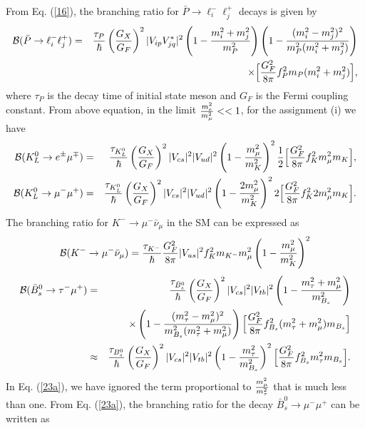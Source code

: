 \documentclass{ws-ijmpa}
\begin{document}
From Eq. (\ref{16}), the branching ratio for $\bar{P}\to \ell^{-}_i\ell^{+}_j$ decays is given by 
\begin{eqnarray}
\mathcal{B}(\bar{P}\to \ell^{-}_i\ell^{+}_j)&=&
\frac{\tau_{P}}{\hbar}\left({G_X\over G_F}\right)^2 |V_{ip}V^{*}_{jq}|^2\left(1-{m^2
_{i}+m^2
_{j}\over m^2_P}\right)\left(1-{(m^2
_{i}-m^2
_{j})^2\over {m^2_P(m^2
_{i}+m^2
_{j})}}\right)\notag\\
&&\times \Big[{G^2_F\over 8\pi}f^2_P
m_P(m^2
_{i}+m^2
_{j})\Big]\label{21},
\end{eqnarray}
where $\tau_{P}$ is the decay time of initial state meson and $G_{F}$ is the Fermi coupling constant. From above equation, in the limit ${m^{2}_{e}\over m^{2}_{\mu}} << 1$, for the assignment (i) we have 
\begin{eqnarray}
\mathcal{B}(K^{0}_{L}\rightarrow e^{\pm}\mu^{\mp}) &=& 
\frac{\tau_{K^0_L}}{\hbar}\left({G_X\over G_F}\right)^2 |V_{cs}|^2|V_{ud}|^2\left(1-{m^2
_{\mu}\over m^2_K}\right)^2{1\over 2}\Big[{G^2_F\over 8\pi}f^2_K
m^2_{\mu}m_K\Big]\label{22},\\
\mathcal{B}(K^{0}_{L}\rightarrow \mu^{-}\mu^{+}) &=& 
\frac{\tau_{K^0_L}}{\hbar}\left({G_X\over G_F}\right)^2 |V_{cs}|^2|V_{ud}|^2\left(1-{2m^2
_{\mu}\over m^2_K}\right)^2 2 \Big[{G^2_F\over 8\pi}f^2_K
2 m^2_{\mu}m_K\Big]\label{23}.
\end{eqnarray}
The branching ratio for $K^{-} \to \mu^{-}\bar{\nu}_{\mu}$ in the SM can be expressed as
\begin{equation}
\mathcal{B}(K^{-} \to \mu^{-}\bar{\nu}_{\mu}) = \frac{\tau_{K^{-}}}{\hbar}\frac{G^{2}_{F}}{8\pi}|V_{us}|^2f^{2}_{K}m_{K^{-}}m^{2}_{\mu}\left(1-{m^2
_{\mu}\over m^2_K}\right)^2\label{KSM}
\end{equation}
\begin{eqnarray}
\mathcal{B}(\bar{B}^{0}_{s}\rightarrow \tau^{-}\mu^{+}) &=& 
\frac{\tau_{\bar{B}^{0}_{s}}}{\hbar}\left({G_X\over G_F}\right)^2 |V_{cs}|^2|V_{tb}|^2\left(1-{m^2
_{\tau}+m^2
_{\mu}\over m^2_{B_s}}\right)\notag\\
&&\times \left(1-{(m^2
_{\tau}-m^2
_{\mu})^2\over {m^2_{B_s}}(m^2
_{\tau}+m^2
_{\mu})}\right) \Big[{G^2_F\over 8\pi}f^2_{B_s}
 (m^2_{\tau}+m^2_{\mu})m_{B_s}\Big]\notag \\
 &\approx & \frac{\tau_{B^0_s}}{\hbar}\left({G_X\over G_F}\right)^2 |V_{cs}|^2|V_{tb}|^2\left(1-{m^2
_{\tau}\over m^2_{B_s}}\right)^2 \Big[{G^2_F\over 8\pi}f^2_{B_s}
 m^2_{\tau}m_{B_s}\Big] \label{23a}.
\end{eqnarray}
In Eq. (\ref{23a}), we have ignored the term proportional to ${m^{2}_{\mu}\over m^{2}_{\tau}}$ that is much less than one. From Eq. (\ref{23a}), the branching ratio for the decay $\bar{B}^{0}_{s}\rightarrow \mu^{-}\mu^{+}$ can be written as
\end{document}
